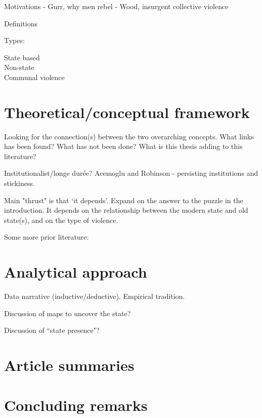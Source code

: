 \documentclass[12pt]{article}
\begin{document}
Motivations - Gurr, why men rebel - Wood, insurgent collective violence

Definitions

Types:

State based \\

Non-state \\ 

Communal violence \\

\section{Theoretical/conceptual framework} \label{Theoretical/conceptual framework}

Looking for the connection(s) between the two overarching concepts. What links
has been found? What has not been done? What is this thesis adding to this
literature?

Institutionalist/longe durée? Acemoglu and Robinson - persisting institutions
and stickiness.

Main "thrust" is that `it depends'. Expand on the answer to the puzzle in the
introduction. It depends on the relationship between the modern state and old
state(s), and on the type of violence.

Some more prior literature: \citet{Griffiths2016} \citet{Ahram2019}

\section{Analytical approach} \label{Analytical approach}

Data narrative (inductive/deductive). Empirical tradition.

Discussion of maps to uncover the state?

Discussion of ``state presence"?

\section{Article summaries} \label{Article summaries}

\section{Concluding remarks} \label{Concluding remarks}

\pagebreak



\end{document}
